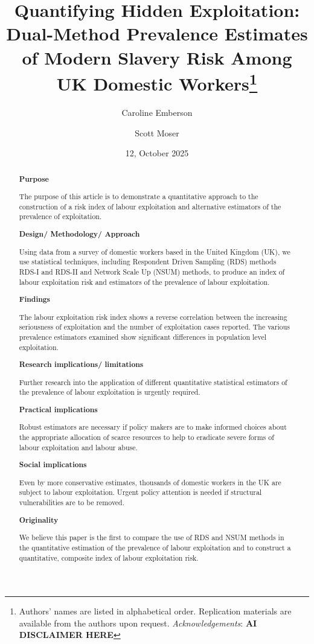 \documentclass[
  12pt,
  letterpaper,
  DIV=11,
  numbers=noendperiod]{scrartcl}
\title{Quantifying Hidden Exploitation: Dual-Method Prevalence Estimates
of Modern Slavery Risk Among UK Domestic Workers\footnote{Authors' names
  are listed in alphabetical order. Replication materials are available
  from the authors upon request. \emph{Acknowledgements}: \textbf{AI
  DISCLAIMER HERE}}}
\author{Caroline Emberson \and Scott Moser}
\date{12, October 2025}
\theoremstyle{plain}
\theoremstyle{definition}
\begin{document}
\maketitle
\begin{abstract}
\textbf{Purpose}

The purpose of this article is to demonstrate a quantitative approach to
the construction of a risk index of labour exploitation and alternative
estimators of the prevalence of exploitation.

\textbf{Design/ Methodology/ Approach}

Using data from a survey of domestic workers based in the United Kingdom
(UK), we use statistical techniques, including Respondent Driven
Sampling (RDS) methods RDS-I and RDS-II and Network Scale Up (NSUM)
methods, to produce an index of labour exploitation risk and estimators
of the prevalence of labour exploitation.

\textbf{Findings}

The labour exploitation risk index shows a reverse correlation between
the increasing seriousness of exploitation and the number of
exploitation cases reported. The various prevalence estimators examined
show significant differences in population level exploitation.

\textbf{Research implications/ limitations}

Further research into the application of different quantitative
statistical estimators of the prevalence of labour exploitation is
urgently required.

\textbf{Practical implications}

Robust estimators are necessary if policy makers are to make informed
choices about the appropriate allocation of scarce resources to help to
eradicate severe forms of labour exploitation and labour abuse.

\textbf{Social implications}

Even by more conservative estimates, thousands of domestic workers in
the UK are subject to labour exploitation. Urgent policy attention is
needed if structural vulnerabilities are to be removed.

\textbf{Originality}

We believe this paper is the first to compare the use of RDS and NSUM
methods in the quantitative estimation of the prevalence of labour
exploitation and to construct a quantitative, composite index of labour
exploitation risk.
\end{abstract}
\end{document}
